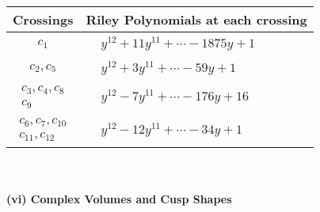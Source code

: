 \documentclass[1p]{elsarticle_modified}
\theoremstyle{definition}
\begin{document}
\begin{tabular}{m{50pt}|m{274pt}}
Crossings & \hspace{64pt}Riley Polynomials at each crossing \\
\hline $$\begin{aligned}c_{1}\end{aligned}$$&$\begin{aligned}
&y^{12}+11 y^{11}+\cdots-1875 y+1
\end{aligned}$\\
\hline $$\begin{aligned}c_{2},c_{5}\end{aligned}$$&$\begin{aligned}
&y^{12}+3 y^{11}+\cdots-59 y+1
\end{aligned}$\\
\hline $$\begin{aligned}c_{3},c_{4},c_{8}\\c_{9}\end{aligned}$$&$\begin{aligned}
&y^{12}-7 y^{11}+\cdots-176 y+16
\end{aligned}$\\
\hline $$\begin{aligned}c_{6},c_{7},c_{10}\\c_{11},c_{12}\end{aligned}$$&$\begin{aligned}
&y^{12}-12 y^{11}+\cdots-34 y+1
\end{aligned}$\\
\hline
\end{tabular}\\~\\
\newpage\flushleft \textbf{(vi) Complex Volumes and Cusp Shapes}
\end{document}
